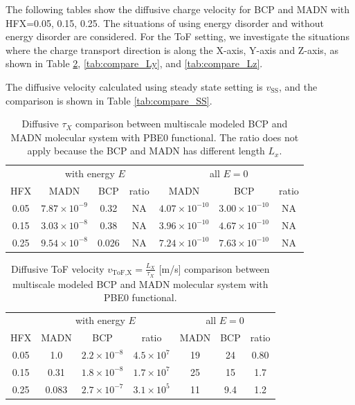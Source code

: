 \documentclass[letterpaper,12pt]{article}
\begin{document}
The following tables show the diffusive charge velocity for BCP and MADN with HFX=0.05, 0.15, 0.25. The situations of using energy disorder and without energy disorder are considered.
For the ToF setting, we investigate the situations where the charge transport direction is along the X-axis, Y-axis and Z-axis, as shown in Table \ref{tab:compare_Lx}, \ref{tab:compare_Ly}, and \ref{tab:compare_Lz}. 

The diffusive velocity calculated using steady state setting is $v_\text{SS}$, and the comparison is shown in Table \ref{tab:compare_SS}.
\begin{table}[H]
\centering
\begin{tabular}{c c c c c c c}
    \toprule
     &
        \multicolumn{3}{c}{ with energy $E$} &
        \multicolumn{3}{c}{all $E=0$}  \\
    HFX & MADN & BCP & ratio & MADN & BCP & ratio  \\
    \cmidrule(r){1-7}
    0.05 & $7.87 \times 10^{-9}$ & 0.32 & NA & $4.07 \times 10^{-10}$ & $3.00 \times 10^{-10}$ & NA \\
    0.15 & $3.03 \times 10^{-8}$ & 0.38 & NA & $3.96 \times 10^{-10}$ & $4.67 \times 10^{-10}$ & NA \\
    0.25 & $9.54 \times 10^{-8}$ & 0.026 & NA & $7.24 \times 10^{-10}$ & $7.63 \times 10^{-10}$ & NA \\
    \bottomrule
    \end{tabular}
    \caption{Diffusive $\tau_X$ comparison between multiscale modeled BCP and MADN molecular system with PBE0 functional. The ratio does not apply because the BCP and MADN has different length $L_x$.}
    \label{tab:compare}
\end{table}

\begin{table}[H]
\centering
\begin{tabular}{c c c c c c c}
    \toprule
        &
        \multicolumn{3}{c}{ with energy $E$} &
        \multicolumn{3}{c}{all $E=0$}  \\
    HFX & MADN & BCP & ratio & MADN & BCP & ratio  \\
    \cmidrule(r){1-7}
    0.05 & 1.0 & $2.2 \times 10^{-8}$ & $4.5 \times 10^{7}$ & 19 & 24 & 0.80 \\
    0.15 & 0.31 & $1.8 \times 10^{-8}$ & $1.7 \times 10^{7}$ & 25 & 15 & 1.7 \\
    0.25 & 0.083 & $2.7 \times 10^{-7}$ & $3.1 \times 10^{5}$ & 11 & 9.4 & 1.2 \\
    \bottomrule
    \end{tabular}
    \caption{Diffusive ToF velocity $v_\text{ToF,X}=\frac{L_X}{\tau_X}$ [m/s] comparison between multiscale modeled BCP and MADN molecular system with PBE0 functional. }
    \label{tab:compare_Lx}
\end{table}
\end{document}
